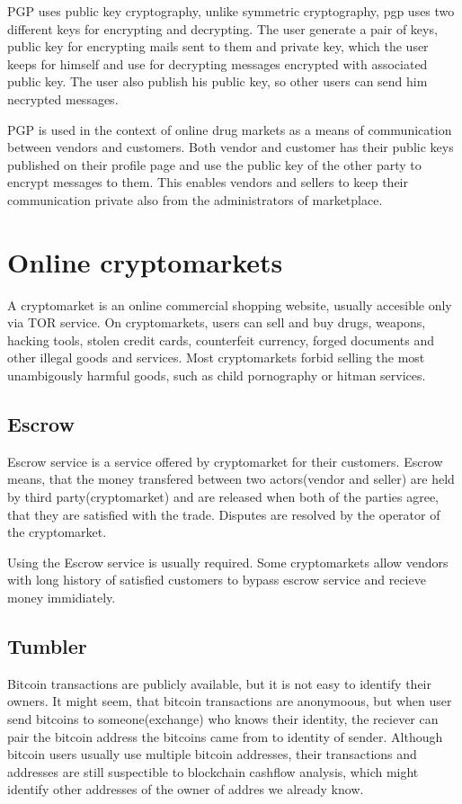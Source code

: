 \documentclass[
  digital, %
  table,   %
  lof,     %
  lot,     %
  oneside
]{fithesis3}
\begin{document}
PGP uses public key cryptography, unlike symmetric cryptography, pgp uses two different keys for encrypting and decrypting.
The user generate a pair of keys, public key for encrypting mails sent to them and private key, which the user
 keeps for himself and use for decrypting messages encrypted with associated public key. The user also publish his public
 key, so other users can send him necrypted messages.

PGP is used in the context of online drug markets as a means of communication between vendors and customers.
Both vendor and customer has their public keys published on their profile page and use the public key of the other
party to encrypt messages to them. This enables vendors and sellers to keep their communication private also 
from the administrators of marketplace.

\section{Online cryptomarkets}
A cryptomarket is an online commercial shopping website, usually accesible only via TOR service.
On cryptomarkets, users can sell and buy  drugs, weapons, hacking tools, stolen credit cards,
counterfeit currency, forged documents and other illegal goods and services.
Most cryptomarkets forbid selling the most unambigously harmful goods, such as
 child pornography or hitman services.

\subsection{Escrow}
Escrow service is a service offered by cryptomarket for their customers.
Escrow means, that the money transfered between two actors(vendor and seller) are held by third party(cryptomarket)
 and are released when both of the parties agree, that they are satisfied with the trade.
 Disputes are resolved by the operator of the cryptomarket.

 Using the Escrow service is usually required.
 Some cryptomarkets allow vendors with long history of satisfied customers to bypass escrow service and recieve money immidiately.
 
\subsection{Tumbler}

Bitcoin transactions are publicly available, but it is not easy to identify their owners.
It might seem, that bitcoin transactions are anonymoous, but when user send bitcoins to
someone(exchange) who knows their identity, the reciever can pair the bitcoin address the bitcoins came from
to identity of sender. Although bitcoin users usually use multiple bitcoin addresses, their transactions and addresses are still 
suspectible to blockchain cashflow analysis, which might identify other addresses of the owner of addres we already know.
\end{document}
